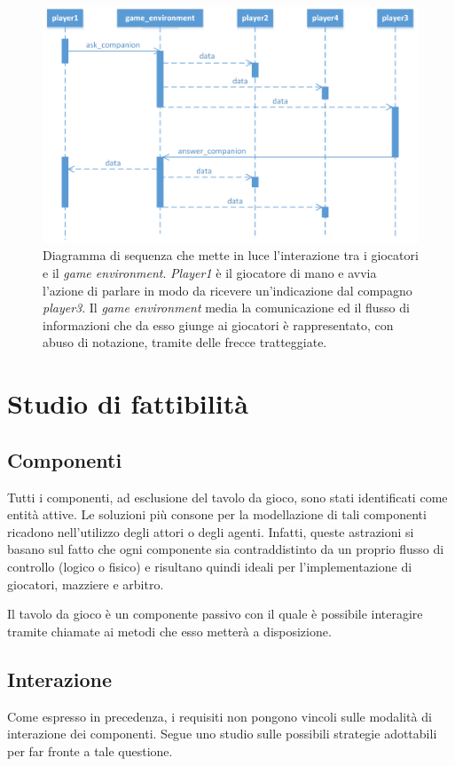 \documentclass[a4paper,12pt]{article}
\begin{document}
\begin{figure}[H]
	\hspace*{-0.85in}
	\centering
	\includegraphics[width=180mm]{./img/speak_sequence_diagram.png}
	\caption{Diagramma di sequenza che mette in luce l'interazione tra i giocatori e il \emph{game environment}. \emph{Player1} è il giocatore di mano e avvia l'azione di parlare in modo da ricevere un'indicazione dal compagno \emph{player3}. Il \emph{game environment} media la comunicazione ed il flusso di informazioni che da esso giunge ai giocatori è rappresentato, con abuso di notazione, tramite delle frecce tratteggiate.}
\end{figure}


\section{Studio di fattibilità}
\subsection{Componenti}
Tutti i componenti, ad esclusione del tavolo da gioco, sono stati identificati come entità attive. Le soluzioni più consone per la modellazione di tali componenti ricadono nell'utilizzo degli attori o degli agenti. Infatti, queste astrazioni si basano sul fatto che ogni componente sia contraddistinto da un proprio flusso di controllo (logico o fisico) e risultano quindi ideali per l'implementazione di giocatori, mazziere e arbitro.

Il tavolo da gioco è un componente passivo con il quale è possibile interagire tramite chiamate ai metodi che esso metterà a disposizione.

\subsection{Interazione}
Come espresso in precedenza, i requisiti non pongono vincoli sulle modalità di interazione dei componenti. Segue uno studio sulle possibili strategie adottabili per far fronte a tale questione.
\end{document}

